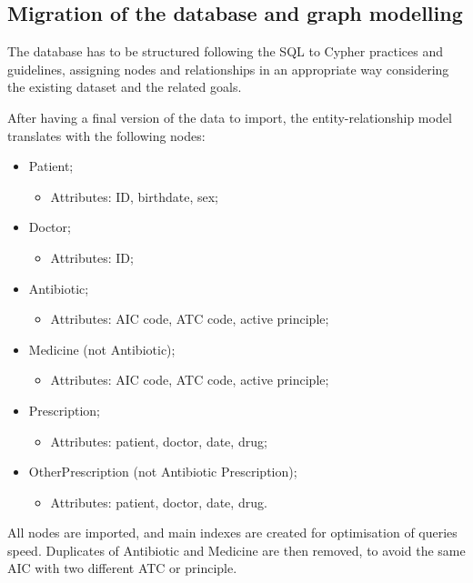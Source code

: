 
\subsection{Migration of the database and graph modelling}
The database has to be structured following the SQL to Cypher practices and guidelines, assigning nodes and relationships in an appropriate way considering the existing dataset and the related goals.

After having a final version of the data to import, the entity-relationship model translates with the following nodes:
\begin{itemize}
	\item Patient;
	\begin{itemize}
		\item Attributes: ID, birthdate, sex;
	\end{itemize}
	\item Doctor;
	\begin{itemize}
		\item Attributes: ID; %
	\end{itemize}
	\item Antibiotic;
	\begin{itemize}
		\item Attributes: AIC code, ATC code, active principle;
	\end{itemize}
	\item Medicine (not Antibiotic);
	\begin{itemize}
		\item Attributes: AIC code, ATC code, active principle;
	\end{itemize}
	\item Prescription;
	\begin{itemize}
		\item Attributes: patient, doctor, date, drug;
	\end{itemize}
	\item OtherPrescription (not Antibiotic Prescription);
	\begin{itemize}
		\item Attributes: patient, doctor, date, drug.
	\end{itemize}
\end{itemize}

All nodes are imported, and main indexes are created for optimisation of queries speed. Duplicates of Antibiotic and Medicine are then removed, to avoid the same AIC with two different ATC or principle.

